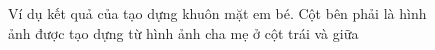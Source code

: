 \documentclass[journal]{IEEEtran}
\begin{document}
\begin{figure}[!t]
\label{refhinh13}
\caption{Ví dụ kết quả của tạo dựng khuôn mặt em bé. Cột bên phải là hình ảnh được tạo dựng từ hình ảnh cha mẹ ở cột trái và giữa}
\end{figure}



\end{document}
